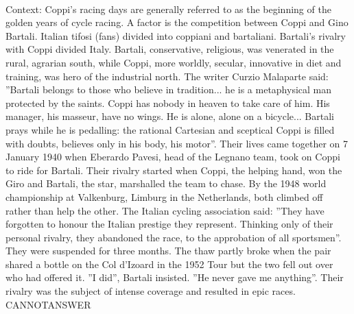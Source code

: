 \documentclass[11pt,a4paper, onecolumn]{article}
\begin{document}
\\ Context: Coppi's racing days are generally referred to as the beginning of the golden years of cycle racing. A factor is the competition between Coppi and Gino Bartali. Italian tifosi (fans) divided into coppiani and bartaliani. Bartali's rivalry with Coppi divided Italy. Bartali, conservative, religious, was venerated in the rural, agrarian south, while Coppi, more worldly, secular, innovative in diet and training, was hero of the industrial north. The writer Curzio Malaparte said: ''Bartali belongs to those who believe in tradition... he is a metaphysical man protected by the saints. Coppi has nobody in heaven to take care of him. His manager, his masseur, have no wings. He is alone, alone on a bicycle... Bartali prays while he is pedalling: the rational Cartesian and sceptical Coppi is filled with doubts, believes only in his body, his motor''. Their lives came together on 7 January 1940 when Eberardo Pavesi, head of the Legnano team, took on Coppi to ride for Bartali. Their rivalry started when Coppi, the helping hand, won the Giro and Bartali, the star, marshalled the team to chase. By the 1948 world championship at Valkenburg, Limburg in the Netherlands, both climbed off rather than help the other. The Italian cycling association said: ''They have forgotten to honour the Italian prestige they represent. Thinking only of their personal rivalry, they abandoned the race, to the approbation of all sportsmen''. They were suspended for three months. The thaw partly broke when the pair shared a bottle on the Col d'Izoard in the 1952 Tour but the two fell out over who had offered it. ''I did'', Bartali insisted. ''He never gave me anything''. Their rivalry was the subject of intense coverage and resulted in epic races. CANNOTANSWER
\end{document}
